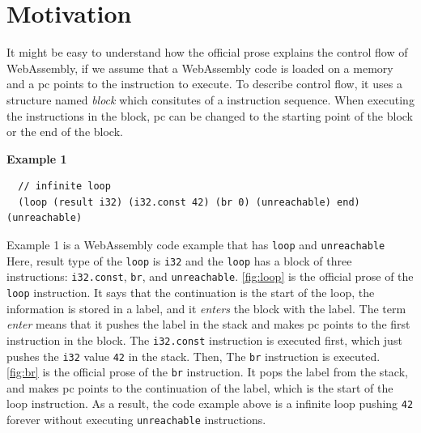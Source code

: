 
\chapter{Motivation}
\label{ch:motivation}
\noindent

\newcommand{\officialp}{official prose}
\newcommand{\spectecp}{SpecTec prose}




It might be easy to understand how the \officialp{} explains the control flow
of WebAssembly, if we assume that a WebAssembly code is loaded on a memory and
a pc points to the instruction to execute.
To describe control flow, it uses a structure named \textit{block} which
consitutes of a instruction sequence.
When executing the instructions in the block, pc can be changed to the starting
point of the block or the end of the block.


\textbf{Example 1}
\begin{verbatim}
  // infinite loop
  (loop (result i32) (i32.const 42) (br 0) (unreachable) end) (unreachable)
\end{verbatim}

Example 1 is a WebAssembly code example that has \texttt{loop} and
\texttt{unreachable}
Here, result type of the \texttt{loop} is \texttt{i32} and the \texttt{loop}
has a block of three instructions: \texttt{i32.const}, \texttt{br}, and
\texttt{unreachable}.
\cref{fig:loop} is the \officialp{} of the \texttt{loop} instruction.
It says that the continuation is the start of the loop, the information is
stored in a label, and it \textit{enters} the block with the label.
The term \textit{enter} means that it pushes the label in the stack and makes
pc points to the first instruction in the block.
The \texttt{i32.const} instruction is executed first, which just pushes the
\texttt{i32} value \texttt{42} in the stack.
Then, The \texttt{br} instruction is executed.
\cref{fig:br} is the \officialp{} of the \texttt{br} instruction.
It pops the label from the stack, and makes pc points to the continuation of
the label, which is the start of the loop instruction.
As a result, the code example above is a infinite loop pushing \texttt{42}
forever without executing \texttt{unreachable} instructions.

